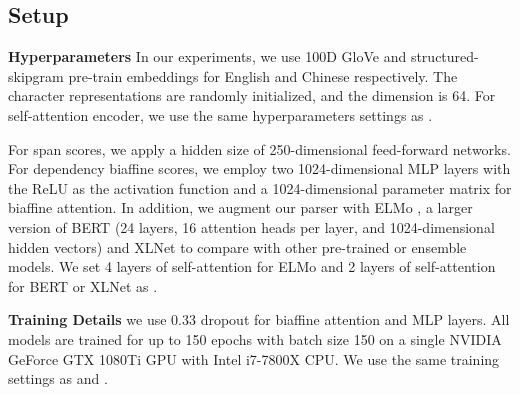 \documentclass[11pt,a4paper]{article}
\begin{document}
\subsection{Setup}

\textbf{Hyperparameters} In our experiments, we use 100D GloVe \cite{PenningtonD14-1162} and structured-skipgram \cite{LingN15-1142} pre-train embeddings for English and Chinese respectively. 
The character representations are randomly initialized, and the dimension is 64. For self-attention encoder, we use the same hyperparameters settings as \cite{Kitaev-2018-SelfAttentive}.

For span scores, we apply a hidden size of 250-dimensional feed-forward networks.
For dependency biaffine scores, we employ two 1024-dimensional MLP layers with the ReLU as the activation function and a 1024-dimensional parameter matrix for biaffine attention. 
In addition, we augment our parser with ELMo \cite{PetersN18-1202}, a larger version of BERT \cite{Jacobbert} (24 layers, 16 attention heads per layer, and 1024-dimensional hidden vectors) and XLNet \cite{XLNet-Zhilin-2019} to compare with other pre-trained or ensemble models.
We set 4 layers of self-attention for ELMo and 2 layers of self-attention for BERT or XLNet as \cite{Kitaev-2018-SelfAttentive, kitaev2018multilingual}.

\noindent \textbf{Training Details} we use 0.33 dropout for biaffine attention and MLP layers. All models are trained for up to 150 epochs with batch size 150 on a single NVIDIA GeForce GTX 1080Ti GPU with Intel i7-7800X CPU. 
We use the same training settings as \cite{Kitaev-2018-SelfAttentive} and \cite{kitaev2018multilingual}.







\begin{table}[t!]
    \centering
{}
    \caption{\label{table1} Different self-attention layers on English dev set.}
\end{table}
\end{document}
